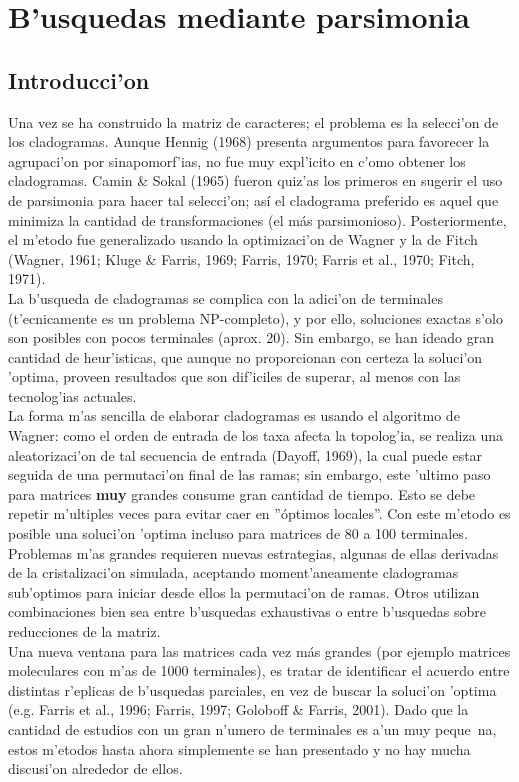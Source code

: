 \chapter{B'usquedas mediante parsimonia}
\section*{Introducci'on}
Una vez se ha construido la matriz de caracteres; el  problema es la selecci'on
de los cladogramas. Aunque Hennig (1968) presenta argumentos para favorecer la
agrupaci'on por sinapomorf'ias, no fue muy expl'icito en c'omo obtener los
cladogramas. Camin \& Sokal (1965) fueron quiz'as los primeros en sugerir el uso
de parsimonia para hacer tal selecci'on; as\'i el cladograma preferido es aquel
que minimiza la cantidad de transformaciones (el m\'as parsimonioso).
Posteriormente, el m'etodo fue generalizado usando la optimizaci'on de Wagner y
la de Fitch (Wagner, 1961; Kluge \& Farris, 1969; Farris, 1970; Farris et al.,
1970; Fitch, 1971).\\
La b'usqueda de cladogramas se complica con la adici'on de terminales
(t'ecnicamente es un problema NP-completo), y por ello, soluciones exactas s'olo
son posibles con pocos terminales (aprox. 20). Sin embargo, se han ideado gran
cantidad de heur'isticas, que aunque no proporcionan con certeza la soluci'on
'optima, proveen resultados que son dif'iciles de superar, al menos con las
tecnolog'ias actuales.\\
La forma m'as sencilla de elaborar cladogramas es usando el algoritmo de
Wagner: como el orden de entrada de los
taxa afecta la topolog'ia, se realiza una aleatorizaci'on de tal secuencia de
entrada (Dayoff, 1969), la cual
puede estar seguida de una permutaci'on final de las ramas; sin embargo, este
'ultimo paso para matrices \textbf{muy} grandes consume gran cantidad de tiempo.
Esto se debe repetir m'ultiples veces para evitar caer en ''\'optimos locales''.
Con este m'etodo es posible una soluci'on 'optima incluso para matrices de 80 a
100 terminales. Problemas m'as grandes requieren nuevas estrategias, algunas de
ellas derivadas de la cristalizaci'on simulada, aceptando moment'aneamente
cladogramas sub'optimos para iniciar desde ellos la permutaci'on de ramas. Otros
utilizan combinaciones bien sea entre b'usquedas exhaustivas o entre b'usquedas
sobre reducciones de la matriz.\\
Una nueva ventana para las matrices cada vez m\'as grandes (por ejemplo matrices
moleculares con m'as de 1000 terminales), es tratar de identificar el acuerdo
entre distintas r'eplicas de b'usquedas parciales, en vez de buscar la soluci'on
'optima (e.g. Farris et al., 1996; Farris, 1997; Goloboff \& Farris, 2001). Dado
que la cantidad de estudios con un gran n'umero de terminales es a'un muy
peque~na, estos m'etodos hasta ahora simplemente se han presentado y no hay
mucha discusi'on alrededor de ellos.
